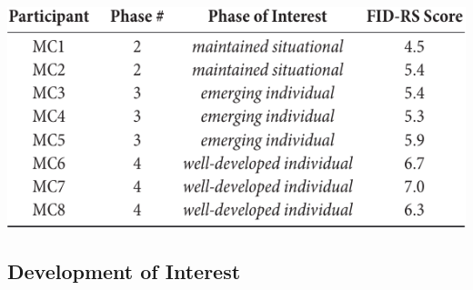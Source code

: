 \documentclass{sigchi}
\begin{document}
\begin{table}[]
	\centering
	\includegraphics[width=1\columnwidth]{figures/chi17-michaelis-figures-table.pdf}
	\caption{Phase of interest for main child participants. The FID-RS score is a measure of individual interest in reading. Note that no participants were found to be in phase 1.}
	\label{tab:table1}
\end{table}

\subsection{Development of Interest}
\end{document}
